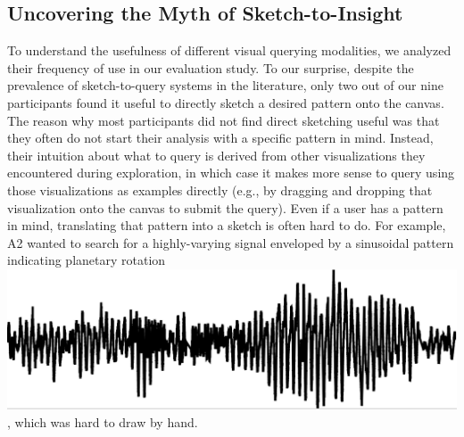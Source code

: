  \subsection{Uncovering the Myth of Sketch-to-Insight}
 \par To understand the usefulness of different visual querying modalities, we analyzed their frequency of use in our evaluation study. To our surprise,
 despite the prevalence of sketch-to-query
 systems in the literature,  only two out of our nine participants
 found it useful to directly
 sketch a desired pattern onto the canvas. %
 The reason why most participants
 did not find direct sketching useful was that
 they often do not start their analysis with a specific pattern in mind.
 Instead, their intuition about what to query is derived
 from other visualizations they encountered
 during exploration, in which case it makes
 more sense to query using those visualizations
 as examples directly (e.g., by dragging and dropping
 that visualization onto the canvas to submit the query).
 Even if a user has a pattern in mind,
 translating that pattern into a sketch is often hard
 to do. For example,
 A2 wanted to search for a highly-varying signal
 enveloped by a sinusoidal pattern indicating
 planetary rotation \includegraphics[width=3.5\baselineskip,keepaspectratio]{figures/impossible_sketch.png}, which was hard to draw by hand.
